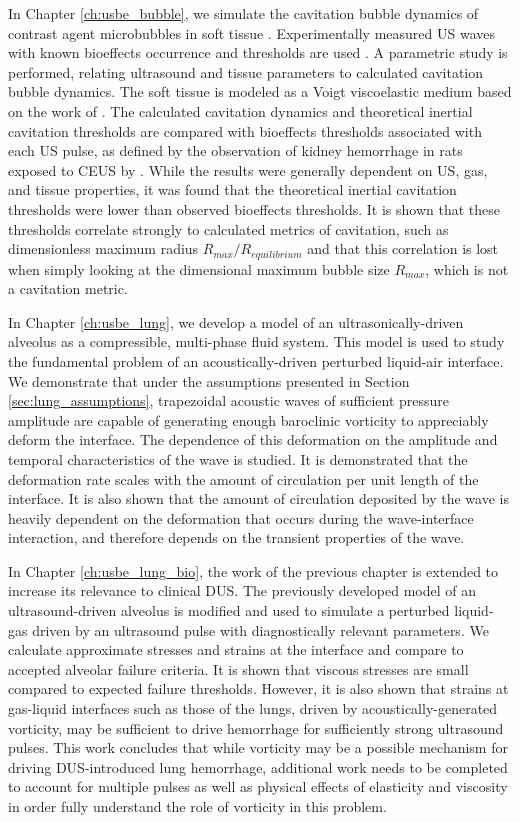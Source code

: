 In Chapter \ref{ch:usbe_bubble}, we simulate the cavitation bubble
dynamics of contrast agent microbubbles in soft tissue
\citep{Patterson2012}. Experimentally measured \ac{US} waves with
known bioeffects occurrence and thresholds are used
\citep{Miller2008b}.  A parametric study is performed, relating
ultrasound and tissue parameters to calculated cavitation bubble
dynamics. The soft tissue is modeled as a Voigt viscoelastic medium
based on the work of \cite{Yang2005}. The calculated cavitation
dynamics and theoretical inertial cavitation thresholds
\citep{Flynn1982,Apfel1982} are compared with bioeffects thresholds
associated with each \ac{US} pulse, as defined by the observation of
kidney hemorrhage in rats exposed to CEUS by \cite{Miller2008b}. While
the results were generally dependent on \ac{US}, gas, and tissue
properties, it was found that the theoretical inertial cavitation
thresholds were lower than observed bioeffects thresholds. It is shown
that these thresholds correlate strongly to calculated metrics of
cavitation, such as dimensionless maximum radius
$R_{max}/R_{equilibrium}$ and that this correlation is lost when
simply looking at the dimensional maximum bubble size $R_{max}$, which
is not a cavitation metric.

In Chapter \ref{ch:usbe_lung}, we develop a model of an
ultrasonically-driven alveolus as a compressible, multi-phase fluid
system. This model is used to study the fundamental problem of an
acoustically-driven perturbed liquid-air interface. We demonstrate
that under the assumptions presented in Section
\ref{sec:lung_assumptions}, trapezoidal acoustic waves of sufficient
pressure amplitude are capable of generating enough baroclinic
vorticity to appreciably deform the interface. The dependence of this
deformation on the amplitude and temporal characteristics of the wave
is studied. It is demonstrated that the deformation rate scales with
the amount of circulation per unit length of the interface. It is
also shown that the amount of circulation deposited by the wave is
heavily dependent on the deformation that occurs during the
wave-interface interaction, and therefore depends on the transient
properties of the wave.

In Chapter \ref{ch:usbe_lung_bio}, the work of the previous chapter is
extended to increase its relevance to clinical \ac{DUS}. The
previously developed model of an ultrasound-driven alveolus is
modified and used to simulate a perturbed liquid-gas driven by an
ultrasound pulse with diagnostically relevant parameters. We calculate
approximate stresses and strains at the interface and compare to
accepted alveolar failure criteria. It is shown that viscous stresses
are small compared to expected failure thresholds. However, it is also
shown that strains at gas-liquid interfaces such as those of the
lungs, driven by acoustically-generated vorticity, may be sufficient
to drive hemorrhage for sufficiently strong ultrasound pulses. This
work concludes that while vorticity may be a possible mechanism for
driving \ac{DUS}-introduced lung hemorrhage, additional work needs to
be completed to account for multiple pulses as well as physical
effects of elasticity and viscosity in order fully understand the role
of vorticity in this problem.

